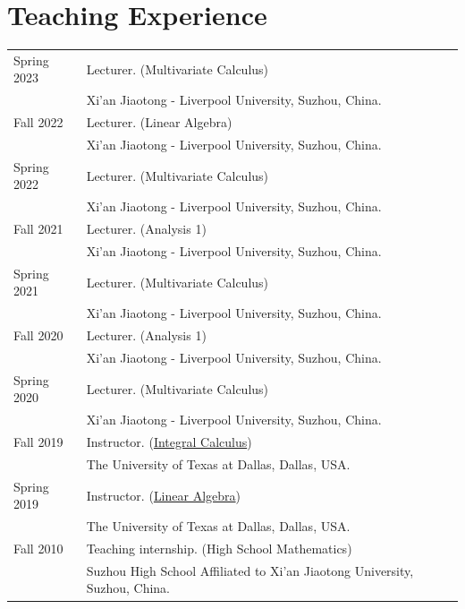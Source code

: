 \documentclass[a4paper,12pt]{article}
\begin{document}
\section*{\Large{Teaching Experience}}
\begin{tabular}{@{}p{1.4in}p{4in}} 
Spring 2023 & Lecturer. (Multivariate Calculus) \\
             & Xi'an Jiaotong - Liverpool University, Suzhou, China.   \\
Fall 2022 & Lecturer. (Linear Algebra) \\
             & Xi'an Jiaotong - Liverpool University, Suzhou, China.   \\
Spring 2022 & Lecturer. (Multivariate Calculus) \\
             & Xi'an Jiaotong - Liverpool University, Suzhou, China.   \\
Fall 2021 & Lecturer. (Analysis 1) \\
               & Xi'an Jiaotong - Liverpool University, Suzhou, China.   \\
Spring 2021 & Lecturer. (Multivariate Calculus) \\
             & Xi'an Jiaotong - Liverpool University, Suzhou, China.   \\
Fall 2020 & Lecturer. (Analysis 1) \\
               & Xi'an Jiaotong - Liverpool University, Suzhou, China.   \\
Spring 2020 & Lecturer. (Multivariate Calculus) \\
             & Xi'an Jiaotong - Liverpool University, Suzhou, China.   \\
Fall 2019 & Instructor. (\href{https://yzhang1616.github.io/calculus19fall/calculus.html}{Integral Calculus}) \\
             & The University of Texas at Dallas, Dallas, USA.   \\
Spring 2019           & Instructor. (\href{https://yzhang1616.github.io/algebra19spring/algebra.html}{Linear Algebra}) \\
                      & The University of Texas at Dallas, Dallas, USA. \\
Fall 2010             & Teaching internship. (High School Mathematics) \\
                      & Suzhou High School Affiliated to Xi'an Jiaotong University, Suzhou, China.                        
\end{tabular}
\end{document}
